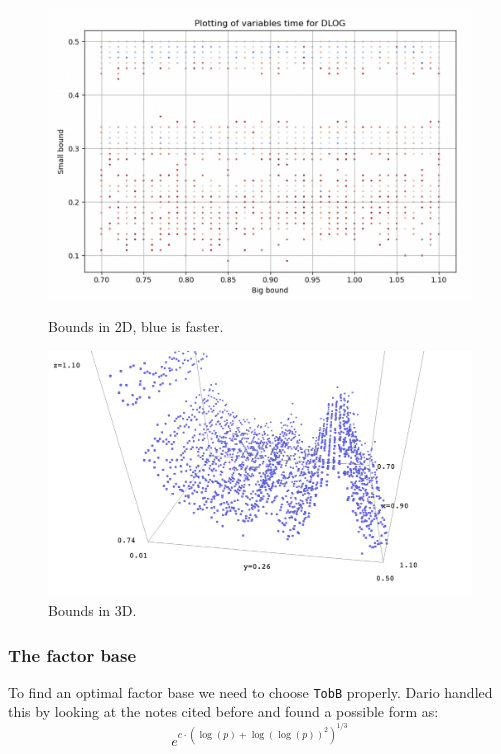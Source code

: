 \documentclass{article}
\theoremstyle{plain}
\theoremstyle{remark}
\theoremstyle{definition}
\begin{document}
\begin{figure}[!tbp]
	\centering
  	\begin{minipage}[b]{0.5\textwidth}
		\label{fig:dlog_plot2d}
   		\includegraphics[width=\textwidth]{dlog_plot2d.png}
    		\caption{Bounds in 2D, blue is faster.}
  	\end{minipage}
  	\hfill
  	\begin{minipage}[b]{0.4\textwidth}
    		\includegraphics[width=\textwidth]{dlog_plot3d.png}
    		\caption{Bounds in 3D.}
  	\end{minipage}
\end{figure}


\subsubsection{The factor base}\label{sssec:fact_base}

To find an optimal factor base we need to choose \texttt{TobB} properly. 
Dario handled this by looking at the notes cited before and found a possible form as:
\begin{equation}
	\label{eq:dlog_topb}
	e^{c\cdot (\log(p) + \log(\log(p))^2)^{1/3}}
\end{equation}
\end{document}

